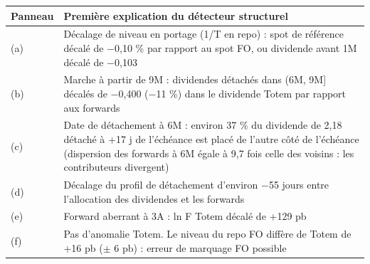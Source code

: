 {\footnotesize\begin{tabular}{lp{13.2cm}}
\toprule
Panneau & Première explication du détecteur structurel \\
\midrule
(a) & Décalage de niveau en portage (1/T en repo) : spot de référence décalé de $-$0,10 \% par rapport au spot FO, ou dividende avant 1M décalé de $-$0,103 \\
(b) & Marche à partir de 9M : dividendes détachés dans (6M, 9M] décalés de $-$0,400 ($-$11 \%) dans le dividende Totem par rapport aux forwards \\
(c) & Date de détachement à 6M : environ 37 \% du dividende de 2,18 détaché à +17 j de l'échéance est placé de l'autre côté de l'échéance (dispersion des forwards à 6M égale à 9,7 fois celle des voisins : les contributeurs divergent) \\
(d) & Décalage du profil de détachement d'environ $-$55 jours entre l'allocation des dividendes et les forwards \\
(e) & Forward aberrant à 3A : ln F Totem décalé de +129 pb \\
(f) & Pas d'anomalie Totem. Le niveau du repo FO diffère de Totem de +16 pb ($\pm$ 6 pb) : erreur de marquage FO possible \\
\bottomrule
\end{tabular}}
